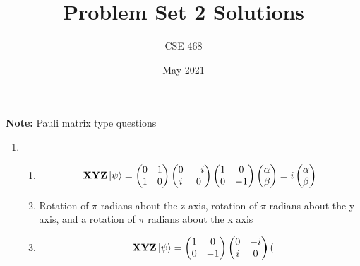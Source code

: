 \documentclass[12pt]{article}
\title{Problem Set 2 Solutions}
\author{CSE 468}
\date{May 2021}
\begin{document}
\maketitle

\noindent \textbf{Note:} Pauli matrix type questions

\begin{enumerate}[font=\bfseries]
    \item 
    \begin{enumerate}
        \item \[ \mathbf{X}\mathbf{Y}\mathbf{Z}\ket{\psi} = 
                \begin{pmatrix} 
                0 & 1 \\
                1 & 0
                \end{pmatrix} 
                \begin{pmatrix} 
                0 & -i \\
                i & 0
                \end{pmatrix} 
                 \begin{pmatrix} 
                1 & 0 \\
                0 & -1
                \end{pmatrix} 
                 \begin{pmatrix} 
                \alpha \\ \beta
                \end{pmatrix} 
                =
                i
                \begin{pmatrix} 
                \alpha \\ \beta
                \end{pmatrix} 
                \]
        \item Rotation of $\pi$ radians about the z axis, rotation of $\pi$ radians about the y axis, and a rotation of $\pi$ radians about the x axis
        \item \[ \mathbf{X}\mathbf{Y}\mathbf{Z}\ket{\psi} = 
                \begin{pmatrix} 
                1 & 0 \\
                0 & -1
                \end{pmatrix} 
                \begin{pmatrix} 
                0 & -i \\
                i & 0
                \end{pmatrix} 
                 \begin{pmatrix} 

\end{pmatrix}\]
\end{enumerate}
\end{enumerate}
\end{document}
